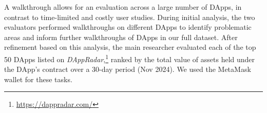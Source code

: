 \documentclass[conference]{IEEEtran}
\begin{document}
A walkthrough allows for an evaluation across a large number of DApps, in contrast to time-limited and costly user studies. During initial analysis, the two evaluators performed walkthroughs on different DApps to identify problematic areas and inform further walkthroughs of DApps in our full dataset.
After refinement based on this analysis, the main researcher evaluated each of the top 50 DApps listed on \textit{DAppRadar},\footnote{\url{https://dappradar.com/}} ranked by the total value of assets held under the DApp's contract over a 30-day period (Nov 2024). We used the MetaMask wallet for these tasks.



\end{document}
